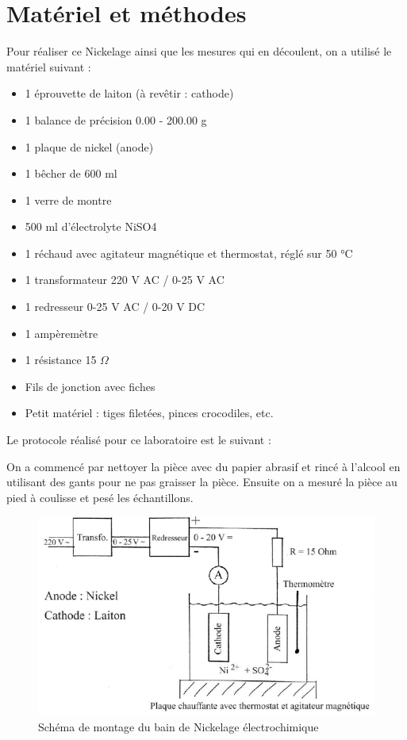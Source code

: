 \section{Matériel et méthodes}

Pour réaliser ce Nickelage ainsi que les mesures qui en découlent, on a utilisé le matériel suivant :

\begin{itemize}[label=\textbullet]
    \item 1 éprouvette de laiton (à revêtir : cathode)
    \item 1 balance de précision 0.00 - 200.00 g
    \item 1 plaque de nickel (anode)
    \item 1 bêcher de 600 ml
    \item 1 verre de montre
    \item 500 ml d'électrolyte NiSO4
    \item 1 réchaud avec agitateur magnétique et thermostat, réglé sur 50 °C
    \item 1 transformateur 220 V AC / 0-25 V AC
    \item 1 redresseur 0-25 V AC / 0-20 V DC
    \item 1 ampèremètre
    \item 1 résistance 15 $\Omega$
    \item Fils de jonction avec fiches
    \item Petit matériel : tiges filetées, pinces crocodiles, etc.   
\end{itemize}

Le protocole réalisé pour ce laboratoire est le suivant :
\vspace{0.3cm}

On a commencé par nettoyer la pièce avec du papier abrasif et rincé à l'alcool en utilisant des gants pour ne pas graisser la pièce. Ensuite on a mesuré la pièce au pied à coulisse et pesé les échantillons.

\begin{figure}[H]
    \centering
    \includegraphics[width=12cm]{logos/schemamontage.png}
    \caption{Schéma de montage du bain de Nickelage électrochimique}
    \label{fig: montagesch}
\end{figure}

